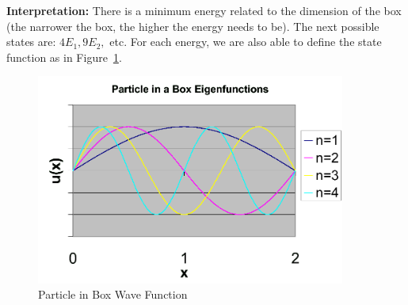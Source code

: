 \documentclass{school-22.101-notes}
\begin{document}
\textbf{Interpretation:} There is a minimum energy related to the dimension of the box (the narrower the box, the higher the energy needs to be). The next possible states are: $4E_1, 9E_2,$ etc. For each energy, we are also able to define the state function as in Figure~\ref{particle-in-box}.
\begin{figure}
    \centering
    \includegraphics[width=4in]{images/qm/1Dparticle-in-box.png}
    \caption{Particle in Box Wave Function\label{particle-in-box}}
\end{figure}

\end{document}
